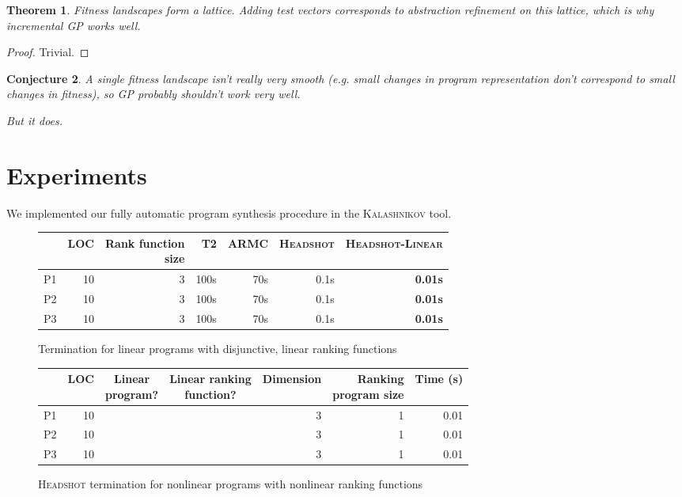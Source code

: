 \documentclass[preprint]{sigplanconf}
\newtheorem{theorem}{Theorem}
\newtheorem{conjecture}[theorem]{Conjecture}
\theoremstyle{definition}
\newcommand{\xmark}{\ding{55}}
\begin{document}
\begin{theorem}
 Fitness landscapes form a lattice.  Adding test vectors corresponds to abstraction refinement on this
 lattice, which is why incremental GP works well.
\end{theorem}

\begin{proof}
 Trivial.
\end{proof}


\begin{conjecture}
 A single fitness landscape isn't really very smooth (e.g. small changes in program representation
 don't correspond to small changes in fitness), so GP probably shouldn't work very well.
 
 But it does.
\end{conjecture}



\section{Experiments}

We implemented our fully automatic program synthesis procedure in the \textsc{Kalashnikov} tool.


\begin{figure*}
\centering
\begin{tabular}{|l|r|r||r|r|r|r|}
\hline
    & LOC & \shortstack{Rank function \\ size} & \textsc{T2} & \textsc{ARMC} & \textsc{Headshot} & \textsc{Headshot-Linear} \\
    \hline
    \hline
 P1 & 10 & 3 & 100s & 70s & 0.1s & \bf{0.01s} \\
 P2 & 10 & 3 & 100s & 70s & 0.1s & \bf{0.01s} \\
 P3 & 10 & 3 & 100s & 70s & 0.1s & \bf{0.01s} \\
 \hline
\end{tabular}
\caption{Termination for linear programs with disjunctive, linear ranking functions\label{fig:linear}}
\end{figure*}

\begin{figure*}
\centering
\begin{tabular}{|l|r|c|c|r|r|r|}
\hline
    & LOC & \shortstack{Linear \\ program?} & \shortstack{Linear ranking \\ function?}  & Dimension & \shortstack{Ranking \\ program size} & Time (s)\\
    \hline
    \hline
 P1 & 10 & \xmark & \xmark & 3 & 1 & 0.01 \\
 P2 & 10 & \xmark & \xmark & 3 & 1 & 0.01 \\
 P3 & 10 & \xmark & \xmark & 3 & 1 & 0.01 \\
 \hline
\end{tabular}

\caption{\textsc{Headshot} termination for nonlinear programs with nonlinear ranking functions\label{fig:nonlinear}}
 \end{figure*}



{}
\end{document}
